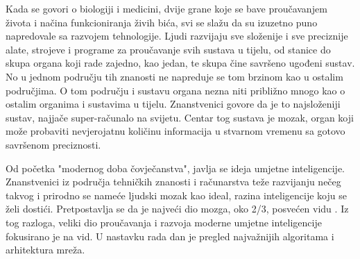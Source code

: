 Kada se govori o biologiji i medicini, dvije grane koje se bave proučavanjem života i načina funkcioniranja živih bića, svi se slažu da su izuzetno puno napredovale sa razvojem tehnologije. Ljudi razvijaju sve složenije i sve preciznije alate, strojeve i programe za proučavanje svih sustava u tijelu, od stanice do skupa organa koji rade zajedno, kao jedan, te skupa čine savršeno ugođeni sustav. No u jednom području tih znanosti ne napreduje se tom brzinom kao u ostalim područjima. O tom području i sustavu organa nezna niti približno mnogo kao o ostalim organima i sustavima u tijelu. Znanstvenici govore da je to najsloženiji sustav, najjače super-računalo na svijetu. Centar tog sustava je mozak, organ koji može probaviti nevjerojatnu količinu informacija u stvarnom vremenu sa gotovo savršenom preciznosti. \par

Od početka "modernog doba čovječanstva", javlja se ideja umjetne inteligencije. Znanstvenici iz područja tehničkih znanosti i računarstva teže razvijanju nečeg takvog i prirodno se nameće ljudski mozak kao ideal, razina inteligencije koju se želi dostići. Pretpostavlja se da je najveći dio mozga, oko 2/3, posvećen vidu \citep{vision_percentage}. Iz tog razloga, veliki dio proučavanja i razvoja moderne umjetne inteligencije fokusirano je na vid. U nastavku rada dan je pregled najvažnijih algoritama i arhitektura mreža.